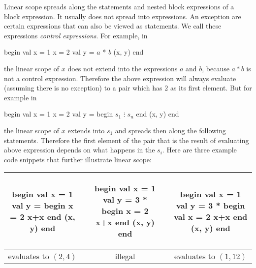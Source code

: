 \documentclass[11pt]{amsart}
\begin{document}
Linear scope spreads along the statements and nested block expressions of a block expression. It usually does not spread into expressions. An exception are certain expressions that can also be viewed as statements. We call these expressions \emph{control expressions}. For example, in
\begin{babellisting}
begin
  val x = 1 
  x = 2
  val y = $a$ * $b$
 (x, y)
end
\end{babellisting}
the linear scope of $x$ does not extend into the expressions $a$ and $b$, because $a * b$ is not a control expression. Therefore the above expression will always evaluate (assuming there is no exception) to a pair which has $2$ as its first element. But for example in
\begin{babellisting}
begin
  val x = 1 
  x = 2
  val y = 
     begin
        $s_1$
        $\vdots$
        $s_n$
     end
  (x, y)
end
\end{babellisting}
the linear scope of $x$ extends into $s_1$ and spreads then along the following statements. Therefore the first element of the pair that is the result of evaluating above expression depends on what happens in the $s_i$.
Here are three example code snippets that further illustrate linear scope:
\begin{center}
\begin{tabular}{ccccc}
\begin{babellisting}
begin
  val x = 1
  val y = 
    begin 
      x = 2 
      x+x 
    end
  (x, y)
end
\end{babellisting}
& \hspace{1cm} &
\begin{babellisting}
begin
  val x = 1
  val y = 3 *
    begin 
      x = 2 
      x+x 
    end
  (x, y)
end
\end{babellisting}
& \hspace{1cm} &
\begin{babellisting}
begin
  val x = 1
  val y = 3 *
    begin 
      val x = 2 
      x+x 
    end
  (x, y)
end
\end{babellisting}\\\hline
evaluates to $(2, 4)$ & &
illegal & &
evaluates to $(1, 12)$ \\[0.5cm]
\end{tabular}
\end{center}
\end{document}
